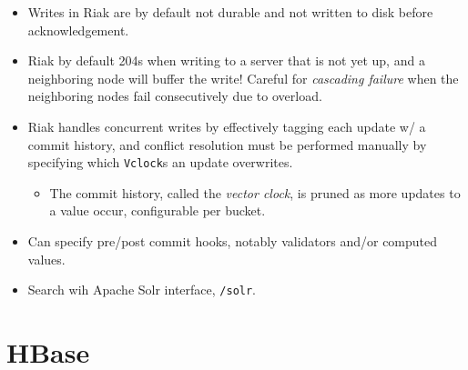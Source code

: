 \documentclass[10pt]{article}
\begin{document}
\begin{itemize}
\begin{itemize}
        \end{itemize}
    \item Writes in Riak are by default not durable and not written to disk
        before acknowledgement.
    \item Riak by default 204s when writing to a server that is not yet up, and
        a neighboring node will buffer the write! Careful for \emph{cascading
        failure} when the neighboring nodes fail consecutively due to overload.
    \item Riak handles concurrent writes by effectively tagging each update w/ a
        commit history, and conflict resolution must be performed manually by
        specifying which \lstinline{Vclock}s an update overwrites.
        \begin{itemize}
            \item The commit history, called the \emph{vector clock}, is pruned
                as more updates to a value occur, configurable per bucket.
        \end{itemize}
    \item Can specify pre/post commit hooks, notably validators and/or computed
        values.
    \item Search wih Apache Solr interface, \lstinline{/solr}.
\end{itemize}

\section{HBase}
\end{document}
